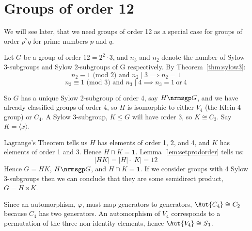 \section{Groups of order 12}
We will see later, that we need groups of order 12 as a special case for groups of order \(p^2q\) for prime numbers
\(p\) and \(q\).

Let \(G\) be a group of order \(12 = 2^2 \cdot 3\), and \(n_3\) and \(n_2\) denote the number of Sylow 3-subgroups and
Sylow 2-subgroups of G respectively.
By Theorem~\ref{thm:sylow3}:
\[n_2 \equiv 1 \text{ (mod 2) and } n_2 \mid 3 \implies n_2 = 1\]
\[n_3 \equiv 1 \text{ (mod 3) and } n_3 \mid 4 \implies n_3 = 1 \ \text{or} \ 4\]

So \(G\) has a unique Sylow 2-subgroup of order 4, say \(H \nrmsgp G\), and we have already classified groups of order 4,
so \(H\) is isomorphic to either \(V_4\) (the Klein 4 group) or \(C_4\).
A Sylow 3-subgroup, \(K \leqslant G\) will have order 3, so \(K \cong C_3\).
Say \(K = \langle x \rangle\).

Lagrange's Theorem tells us \(H\) has elements of order 1, 2, and 4, and \(K\) has elements of order 1 and 3.
Hence \(H \cap K = \bm{1}\).
Lemma~\ref{lem:setprodorder} tells us:
\[|HK| = |H| \cdot |K| = 12\]
Hence \(G = HK\), \(H \nrmsgp G\), and \(H \cap K = \bm{1}\).
If we consider groups with 4 Sylow 3-subgroups then we can conclude that they are some semidirect product, \(G = H
\rtimes K\).

Since an automorphism, \(\varphi\), must map generators to generators, \(\Aut{C_4} \cong C_2\) because \(C_4\) has two
generators.
An automorphism of \(V_4\) corresponds to a permutation of the three
non-identity elements, hence \(\Aut{V_4} \cong S_3\).

